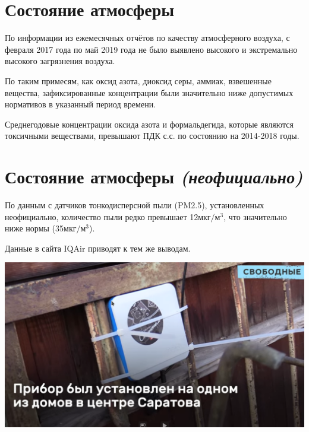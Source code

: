 
\section{Состояние атмосферы}
\begin{frame}{\insertsectionhead}
    \footnotesize
    По информации из ежемесячных отчётов по качеству
    атмосферного воздуха\cite{goveco}, с февраля 2017 года
    по май 2019 года не было выявлено высокого и 
    экстремально высокого загрязнения воздуха.

    \medskip

    По таким примесям, как оксид азота, 
    диоксид серы, аммиак, взвешенные вещества, 
    зафиксированные концентрации были значительно ниже допустимых нормативов
    в указанный период времени. 

    \medskip

    Среднегодовые концентрации оксида азота и формальдегида,
    которые являются токсичными веществами,
    превышают ПДК с.с. по состоянию на 2014-2018 годы.

\end{frame}

\section{Состояние атмосферы \textit{(неофициально)}}
\begin{frame}{\insertsectionhead}
    \begin{minipage}{0.55\textwidth}
        По данным с датчиков тонкодисперсной пыли (PM2.5), 
        установленных неофициально, количество пыли 
        редко превышает 12$\text{мкг}/\text{м}^3$,
        что значительно ниже нормы (35$\text{мкг}/\text{м}^3$).

        \medskip

        Данные в сайта IQAir\cite{iqair} приводят к тем же выводам.
    \end{minipage}
    \begin{minipage}{0.40\textwidth}
        \hspace{1em}
        \includegraphics[width=\textwidth]{assets/device.png}
    \end{minipage}
\end{frame}

